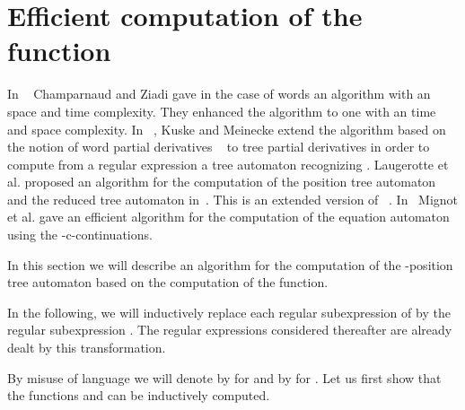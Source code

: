 \documentclass{llncs}
\begin{document}
\section{Efficient computation of the function }\label{sec algo}
In ~\cite{automate1} Champarnaud and Ziadi gave in the case of words an algorithm with an  space and time complexity. 
They enhanced the algorithm to one with an  time and space complexity.
In ~\cite{automate2}, Kuske and Meinecke extend the algorithm based on the notion of word partial derivatives ~\cite{antimirov} to tree partial derivatives in order to compute from a regular expression    a tree automaton recognizing . Laugerotte et al. proposed an algorithm for the computation of the position tree automaton and the reduced tree automaton in~\cite{Ouali}. This is an extended version of ~\cite{Ouali}. In~\cite{cie,arxiv2} Mignot et al. gave an efficient algorithm for the computation of the equation automaton using the -c-continuations. 


In this section we will describe an algorithm for the computation of the -position tree automaton based on the computation of the  function.


In the following, we will inductively replace each regular subexpression  of  by the regular subexpression . The regular expressions considered thereafter are already dealt by this transformation.

 
By misuse of language we will denote by  for  and by  for . Let us first show that the functions  and  can be inductively computed.
 
  
\end{document}
